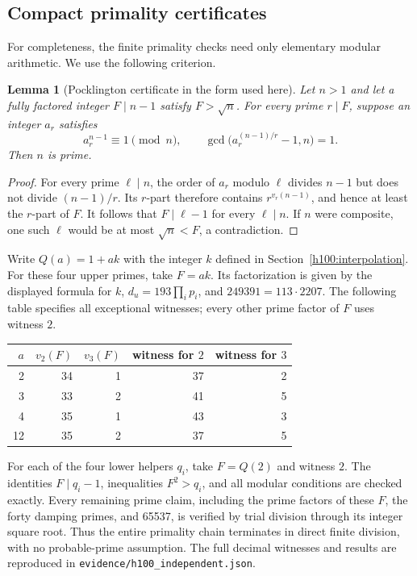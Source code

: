 \documentclass[11pt]{article}
\numberwithin{equation}{section}
\newtheorem{lemma}[theorem]{Lemma}
\theoremstyle{definition}
\theoremstyle{remark}
\begin{document}
\subsection{Compact primality certificates}
For completeness, the finite primality checks need only elementary modular
arithmetic. We use the following criterion.
\begin{lemma}[Pocklington certificate in the form used here]
Let $n>1$ and let a fully factored integer $F\mid n-1$ satisfy $F>\sqrt n$.
For every prime $r\mid F$, suppose an integer $a_r$ satisfies
\[
 a_r^{n-1}\equiv1\pmod n,\qquad
 \gcd\bigl(a_r^{(n-1)/r}-1,n\bigr)=1.
\]
Then $n$ is prime.
\end{lemma}
\begin{proof}
For every prime $\ell\mid n$, the order of $a_r$ modulo $\ell$ divides
$n-1$ but does not divide $(n-1)/r$. Its $r$-part therefore contains
$r^{v_r(n-1)}$, and hence at least the $r$-part of $F$. It follows that
$F\mid\ell-1$ for every $\ell\mid n$. If $n$ were composite, one such
$\ell$ would be at most $\sqrt n<F$, a contradiction.
\end{proof}
Write $Q(a)=1+ak$ with the integer $k$ defined in
Section~\ref{h100:interpolation}. For these four upper primes, take
$F=ak$. Its factorization is given by the displayed formula for $k$,
$d_u=193\prod_i p_i$, and $249391=113\cdot2207$.
The following table specifies all exceptional witnesses; every other prime
factor of $F$ uses witness $2$.
\begin{center}\small
\begin{tabular}{rrrrr}\toprule
$a$ & $v_2(F)$ & $v_3(F)$ & witness for $2$ & witness for $3$\\\midrule
2 & 34 & 1 & 37 & 2\\
3 & 33 & 2 & 41 & 5\\
4 & 35 & 1 & 43 & 3\\
12 & 35 & 2 & 37 & 5\\\bottomrule
\end{tabular}\end{center}
For each of the four lower helpers $q_i$, take $F=Q(2)$ and witness $2$.
The identities $F\mid q_i-1$, inequalities $F^2>q_i$, and all modular
conditions are checked exactly. Every remaining prime claim, including the
prime factors of these $F$, the forty damping primes, and 65537, is verified
by trial division through its integer square root. Thus the entire primality
chain terminates in direct finite division, with no probable-prime assumption.
The full decimal witnesses and results are reproduced in
\texttt{evidence/h100\_independent.json}.
\end{document}
